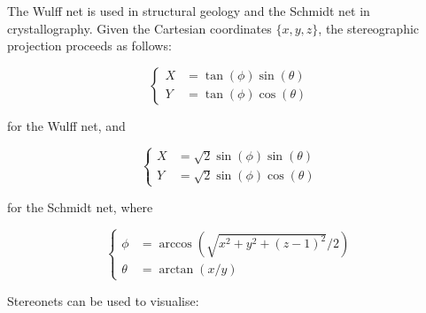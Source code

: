 The Wulff net is used in structural geology and the Schmidt net in
crystallography. Given the Cartesian coordinates $\{x,y,z\}$, the
stereographic projection proceeds as follows:

\begin{equation}
  \left\{
  \begin{split}
    X & = \tan(\phi) \sin(\theta) \\
    Y & = \tan(\phi) \cos(\theta)
  \end{split}
  \right.
\end{equation}

\noindent for the Wulff net, and 

\begin{equation}
  \left\{
  \begin{split}
    X & = \sqrt{2}\sin(\phi)\sin(\theta) \\
    Y & = \sqrt{2}\sin(\phi)\cos(\theta)
  \end{split}
  \right.
\end{equation}

\noindent for the Schmidt net, where

\begin{equation}
  \left\{
  \begin{split}
    \phi & = \arccos\left(\sqrt{{x^2+y^2+(z-1)^2}}/{2}\right) \\
    \theta & = \arctan\left({x}/{y}\right)
  \end{split}
  \right.
\end{equation}

Stereonets can be used to visualise:

